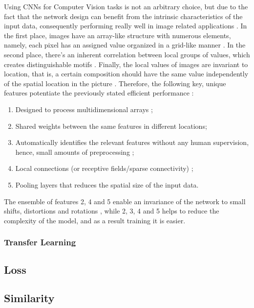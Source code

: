 \documentclass[class=report, crop=false, a4paper, 12pt]{standalone}
\begin{document}
\par Using CNNs for Computer Vision tasks is not an arbitrary choice, but due to the fact that the network design can benefit from the intrinsic characteristics of the input data, consequently performing really well in image related applications \autocite{lecunDeepLearning2015,caoReviewNeuralNetworks2018}. In the first place, images have an array-like structure with numerous elements, namely, each pixel has an assigned value organized in a grid-like manner \autocite{yamashitaConvolutionalNeuralNetworks2018}. In the second place, there's an inherent correlation between local groups of values, which creates distinguishable motifs \autocite{lecunDeepLearning2015}. Finally, the local values of images are invariant to location, that is, a certain composition should have the same value independently of the spatial location in the picture \autocite{lecunDeepLearning2015}. Therefore, the following key, unique features potentiate the previously stated efficient performance \autocite{caoReviewNeuralNetworks2018}:
\begin{enumerate}
    \item Designed to process multidimensional arrays \autocite{lecunDeepLearning2015};
    \item Shared weights between the same features in different locations; %
    \item Automatically identifies the relevant features without any human supervision, hence, small amounts of preprocessing \autocite{alzubaidiReviewDeepLearning2021,liSurveyConvolutionalNeural2022}; %
    \item Local connections (or receptive fields/sparse connectivity) \autocite{alzubaidiReviewDeepLearning2021}; %
    \item Pooling layers that reduces the spatial size of the input data. %
\end{enumerate}

The ensemble of features 2, 4 and 5 enable an invariance of the network to small shifts, distortions and rotations \autocite{guRecentAdvancesConvolutional2018,lecunDeepLearning2015}, while 2, 3, 4 and 5 helps to reduce the complexity of the model, and as a result training it is easier\autocite{guRecentAdvancesConvolutional2018,liSurveyConvolutionalNeural2022}.

\label{transf learning}
\subsubsection{Transfer Learning}

\subsection{Loss}
\subsection{Similarity}
\end{document}
